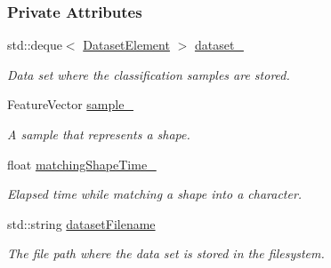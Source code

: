 \subsubsection*{Private Attributes}
\begin{CompactItemize}
\item 
\hypertarget{class_classifier_ed02e9873fd6e85950ae1e1a6f3d45bf}{
std::deque$<$ \hyperlink{class_classifier_3487f0cd88135d7782cf4a460e221e9e}{DatasetElement} $>$ \hyperlink{class_classifier_ed02e9873fd6e85950ae1e1a6f3d45bf}{dataset\_\-}}
\label{class_classifier_ed02e9873fd6e85950ae1e1a6f3d45bf}

\begin{CompactList}\small\item\em Data set where the classification samples are stored. \item\end{CompactList}\item 
\hypertarget{class_classifier_3d46e3d6546304f24db6d9402375988a}{
FeatureVector \hyperlink{class_classifier_3d46e3d6546304f24db6d9402375988a}{sample\_\-}}
\label{class_classifier_3d46e3d6546304f24db6d9402375988a}

\begin{CompactList}\small\item\em A sample that represents a shape. \item\end{CompactList}\item 
\hypertarget{class_classifier_3404a15b2bd381782cce404b56a5fce7}{
float \hyperlink{class_classifier_3404a15b2bd381782cce404b56a5fce7}{matchingShapeTime\_\-}}
\label{class_classifier_3404a15b2bd381782cce404b56a5fce7}

\begin{CompactList}\small\item\em Elapsed time while matching a shape into a character. \item\end{CompactList}\item 
\hypertarget{class_classifier_758002d8431c62af065433b707ffde98}{
std::string \hyperlink{class_classifier_758002d8431c62af065433b707ffde98}{datasetFilename}}
\label{class_classifier_758002d8431c62af065433b707ffde98}

\begin{CompactList}\small\item\em The file path where the data set is stored in the filesystem. \item\end{CompactList}\end{CompactItemize}


